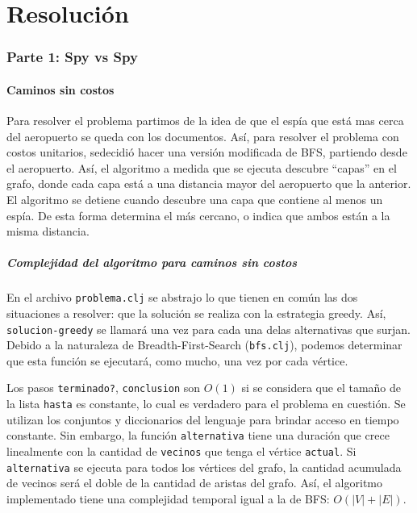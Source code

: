\documentclass{article}
\begin{document}
\part{Resolución}
\section{Parte 1: Spy vs Spy}

\subsection{Caminos sin costos}
Para resolver el problema partimos de la idea de que el espía que está mas cerca del aeropuerto se queda con los documentos. Así, para resolver el problema con costos unitarios, sedecidió hacer una versión modificada de BFS, partiendo desde el aeropuerto. Así, el algoritmo a medida que se ejecuta descubre ``capas'' en el grafo, donde cada capa está a una distancia mayor del aeropuerto que la anterior. El algoritmo se detiene cuando descubre una capa que contiene al menos un espía. De esta forma determina el más cercano, o indica que ambos están a la misma distancia.

\subsubsection{Complejidad del algoritmo para caminos sin costos}

En el archivo \texttt{problema.clj} se abstrajo lo que tienen en común las dos situaciones a resolver: que la solución se realiza con la estrategia greedy. Así, \texttt{solucion-greedy} se llamará una vez para cada una delas alternativas que surjan. Debido a la naturaleza de Breadth-First-Search (\texttt{bfs.clj}), podemos determinar que esta función se ejecutará, como mucho, una vez por cada vértice.

Los pasos \texttt{terminado?}, \texttt{conclusion} son $O(1)$ si se considera que el tamaño de la lista \texttt{hasta} es constante, lo cual es verdadero para el problema en cuestión. Se utilizan los conjuntos y diccionarios del lenguaje para brindar acceso en tiempo constante. Sin embargo, la función \texttt{alternativa} tiene una duración que crece linealmente con la cantidad de \texttt{vecinos} que tenga el vértice \texttt{actual}. Si \texttt{alternativa} se ejecuta para todos los vértices del grafo, la cantidad acumulada de vecinos será el doble de la cantidad de aristas del grafo. Así, el algoritmo implementado tiene una complejidad temporal igual a la de BFS: $O(|V|+|E|)$.
\end{document}
